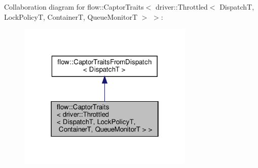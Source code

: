 Collaboration diagram for flow\+:\+:Captor\+Traits$<$ driver\+:\+:Throttled$<$ DispatchT, Lock\+PolicyT, ContainerT, Queue\+MonitorT $>$ $>$\+:
\nopagebreak
\begin{figure}[H]
\begin{center}
\leavevmode
\includegraphics[width=238pt]{structflow_1_1_captor_traits_3_01driver_1_1_throttled_3_01_dispatch_t_00_01_lock_policy_t_00_01_85def682def35b36744c18cf6f6e3210}
\end{center}
\end{figure}
